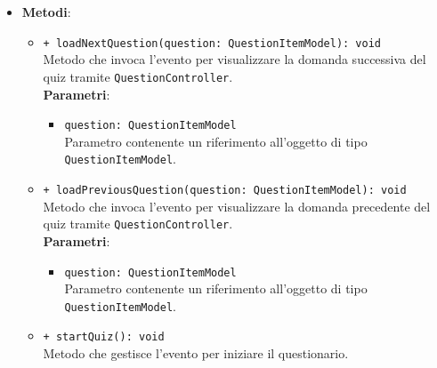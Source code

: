 \begin{itemize}
\begin{itemize}
\begin{itemize}
			\end{itemize}	
		\end{itemize}
		\item \textbf{Metodi}: 
		\begin{itemize}
			\item \texttt{+ loadNextQuestion(question: QuestionItemModel): void}\\
			Metodo che invoca l'evento per visualizzare la domanda successiva del quiz tramite \texttt{QuestionController}. \\
			\textbf{Parametri}:
			\begin{itemize}
				\item \texttt{question: QuestionItemModel} \\
				Parametro contenente un riferimento all'oggetto di tipo \texttt{QuestionItemModel}.
			\end{itemize}
			\item \texttt{+ loadPreviousQuestion(question: QuestionItemModel): void} \\
			Metodo che invoca l'evento per visualizzare la domanda precedente del quiz tramite \texttt{QuestionController}. \\
			\textbf{Parametri}:
			\begin{itemize}
				\item \texttt{question: QuestionItemModel} \\
				Parametro contenente un riferimento all'oggetto di tipo \texttt{QuestionItemModel}.
			\end{itemize}
			\item \texttt{+ startQuiz(): void} \\
			Metodo che gestisce l'evento per iniziare il questionario. 
		\end{itemize}
	\end{itemize}
	
	